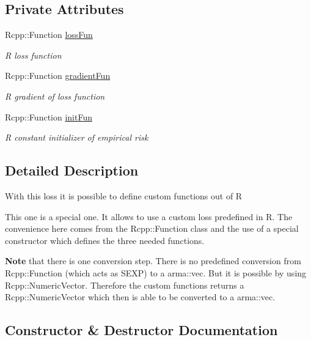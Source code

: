 \subsection*{Private Attributes}
\begin{DoxyCompactItemize}
\item 
Rcpp\+::\+Function \mbox{\hyperlink{classloss_1_1_custom_loss_a90aa6d3240cd14bc3ede21af38b70c8a}{loss\+Fun}}
\begin{DoxyCompactList}\small\item\em {\ttfamily R} loss function \end{DoxyCompactList}\item 
Rcpp\+::\+Function \mbox{\hyperlink{classloss_1_1_custom_loss_af3f00f7f006f7466c79fff83d763c359}{gradient\+Fun}}
\begin{DoxyCompactList}\small\item\em {\ttfamily R} gradient of loss function \end{DoxyCompactList}\item 
Rcpp\+::\+Function \mbox{\hyperlink{classloss_1_1_custom_loss_a0c7a32f9ab123e8bc45154103f295055}{init\+Fun}}
\begin{DoxyCompactList}\small\item\em {\ttfamily R} constant initializer of empirical risk \end{DoxyCompactList}\end{DoxyCompactItemize}


\subsection{Detailed Description}
With this loss it is possible to define custom functions out of {\ttfamily R} 

This one is a special one. It allows to use a custom loss predefined in R. The convenience here comes from the \textquotesingle{}Rcpp\+::\+Function\textquotesingle{} class and the use of a special constructor which defines the three needed functions.

{\bfseries Note} that there is one conversion step. There is no predefined conversion from {\ttfamily Rcpp\+::\+Function} (which acts as S\+E\+XP) to a {\ttfamily arma\+::vec}. But it is possible by using {\ttfamily Rcpp\+::\+Numeric\+Vector}. Therefore the custom functions returns a {\ttfamily Rcpp\+::\+Numeric\+Vector} which then is able to be converted to a {\ttfamily arma\+::vec}. 

\subsection{Constructor \& Destructor Documentation}
\mbox{\label{classloss_1_1_custom_loss_ae3e34f8cab5f6c317412a32f27542f92}} 
